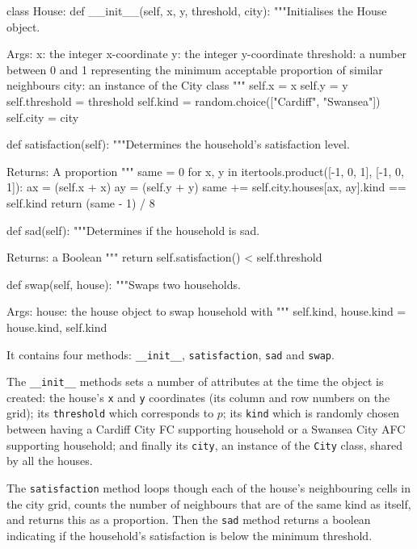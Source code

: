 \begin{pyin}
class House:
    def __init__(self, x, y, threshold, city):
        """Initialises the House object.

        Args:
            x: the integer x-coordinate
            y: the integer y-coordinate
            threshold: a number between 0 and 1 representing
              the minimum acceptable proportion of similar
              neighbours
            city: an instance of the City class
        """
        self.x = x
        self.y = y
        self.threshold = threshold
        self.kind = random.choice(["Cardiff", "Swansea"])
        self.city = city

    def satisfaction(self):
        """Determines the household's satisfaction level.

        Returns:
            A proportion
        """
        same = 0
        for x, y in itertools.product([-1, 0, 1], [-1, 0, 1]):
            ax = (self.x + x) %
            ay = (self.y + y) %
            same += self.city.houses[ax, ay].kind == self.kind
        return (same - 1) / 8

    def sad(self):
        """Determines if the household is sad.

        Returns:
            a Boolean
        """
        return self.satisfaction() < self.threshold

    def swap(self, house):
        """Swaps two households.

        Args:
            house: the house object to swap household with
        """
        self.kind, house.kind = house.kind, self.kind
\end{pyin}

It contains four methods: \texttt{__init__},
\texttt{satisfaction}, \texttt{sad} and
\texttt{swap}.

The \texttt{__init__} methods sets a number of attributes at the
time the object is created: the house's \texttt{x} and
\texttt{y} coordinates (its column and row numbers on the grid);
its \texttt{threshold} which corresponds to \(p\); its
\texttt{kind} which is randomly chosen between having a Cardiff City
FC supporting household or a Swansea City AFC supporting household; and finally
its \texttt{city}, an instance of the \texttt{City}
class, shared by all the houses.

The \texttt{satisfaction} method loops though each of the house's
neighbouring cells in the city grid, counts the number of neighbours that are
of the same kind as itself, and returns this as a proportion.
Then the \texttt{sad} method returns a boolean indicating if the
household's satisfaction is below the minimum threshold.

